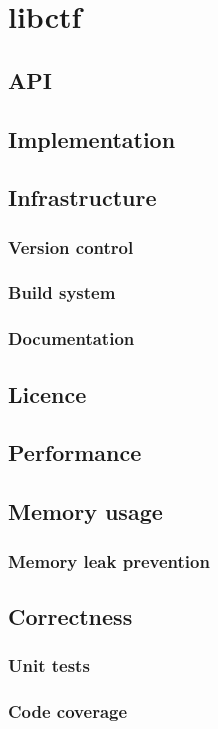 \chapter{libctf}

\section{API}

\section{Implementation}

\section{Infrastructure}

\subsection{Version control}

\subsection{Build system}

\subsection{Documentation}

\section{Licence}

\section{Performance}

\section{Memory usage}

\subsection{Memory leak prevention}

\section{Correctness}
\subsection{Unit tests}
\subsection{Code coverage}

